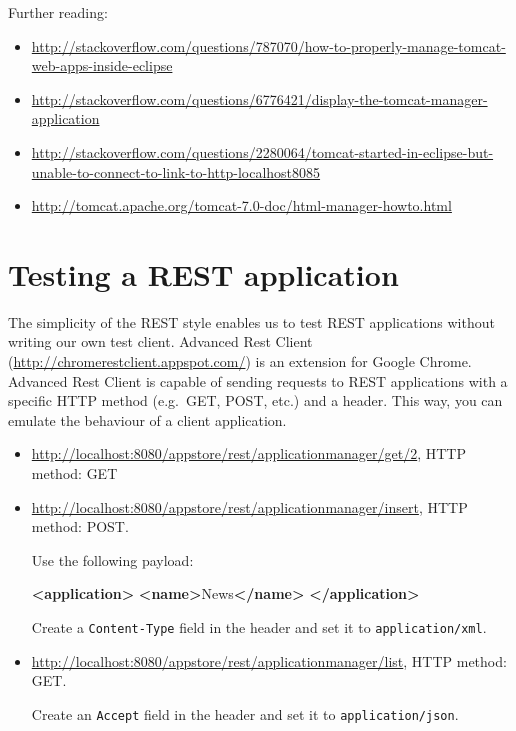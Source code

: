 \documentclass[]{report}
\newenvironment{Shaded}{}{}
\newcommand{\KeywordTok}[1]{\textcolor[rgb]{0.00,0.44,0.13}{\textbf{{#1}}}}
\newcommand{\NormalTok}[1]{{#1}}
\begin{document}
Further reading:

\begin{itemize}
\itemsep1pt\parskip0pt
\item
  \url{http://stackoverflow.com/questions/787070/how-to-properly-manage-tomcat-web-apps-inside-eclipse}
\item
  \url{http://stackoverflow.com/questions/6776421/display-the-tomcat-manager-application}
\item
  \url{http://stackoverflow.com/questions/2280064/tomcat-started-in-eclipse-but-unable-to-connect-to-link-to-http-localhost8085}
\item
  \url{http://tomcat.apache.org/tomcat-7.0-doc/html-manager-howto.html}
\end{itemize}

\section{Testing a REST application}

The simplicity of the REST style enables us to test REST applications
without writing our own test client. Advanced Rest Client
(\url{http://chromerestclient.appspot.com/}) is an extension for Google
Chrome. Advanced Rest Client is capable of sending requests to REST
applications with a specific HTTP method (e.g.~GET, POST, etc.) and a
header. This way, you can emulate the behaviour of a client application.

\begin{itemize}
\item
  \url{http://localhost:8080/appstore/rest/applicationmanager/get/2},
  HTTP method: GET
\item
  \url{http://localhost:8080/appstore/rest/applicationmanager/insert},
  HTTP method: POST.

  Use the following payload:

\begin{Shaded}
\begin{Highlighting}[]
\KeywordTok{<application>}
  \KeywordTok{<name>}\NormalTok{News}\KeywordTok{</name>}
\KeywordTok{</application>}
\end{Highlighting}
\end{Shaded}

  Create a \texttt{Content-Type} field in the header and set it to
  \texttt{application/xml}.
\item
  \url{http://localhost:8080/appstore/rest/applicationmanager/list},
  HTTP method: GET.

  Create an \texttt{Accept} field in the header and set it to
  \texttt{application/json}.
\end{itemize}
\end{document}
